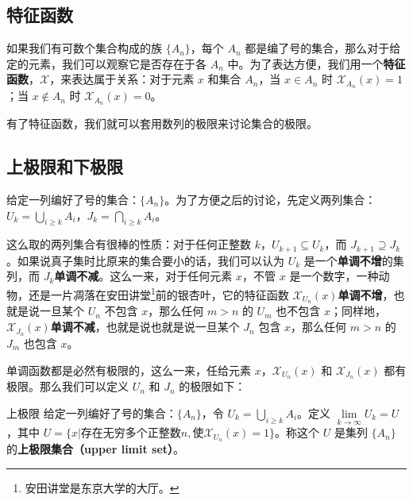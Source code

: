 



\subsection{特征函数}
如果我们有可数个集合构成的族 $\{A_n\}$，每个 $A_n$ 都是编了号的集合，那么对于给定的元素，我们可以观察它是否存在于各 $A_n$ 中。为了表达方便，我们用一个\textbf{特征函数}，$\mathcal{X}$，来表达属于关系：对于元素 $x$ 和集合 $A_n$，当 $x\in A_n$ 时 $\mathcal{X}_{A_n}(x)=1$；当 $x\not\in A_n$ 时 $\mathcal{X}_{A_n}(x)=0$。

有了特征函数，我们就可以套用数列的极限来讨论集合的极限。

\subsection{上极限和下极限}
给定一列编好了号的集合：$\{A_n\}$。为了方便之后的讨论，先定义两列集合：$U_k=\underset{i\ge k}{\bigcup}A_i$，$J_k=\underset{i\ge k}{\bigcap} A_i$。

这么取的两列集合有很棒的性质：对于任何正整数 $k$，$U_{k+1}\subseteq U_k$，而 $J_{k+1}\supseteq J_k$。如果说真子集时比原来的集合要小的话，我们可以认为 $U_k$ 是一个\textbf{单调不增}的集列，而 $J_k$\textbf{单调不减}。这么一来，对于任何元素 $x$，不管 $x$ 是一个数字，一种动物，还是一片凋落在安田讲堂\footnote{安田讲堂是东京大学的大厅。}前的银杏叶，它的特征函数 $\mathcal{X}_{U_n}(x)$\textbf{单调不增}，也就是说一旦某个 $U_n$ 不包含 $x$，那么任何 $m>n$ 的 $U_m$ 也不包含 $x$；同样地，$\mathcal{X}_{J_n}(x)$\textbf{单调不减}，也就是说也就是说一旦某个 $J_n$ 包含 $x$，那么任何 $m>n$ 的 $J_m$ 也包含 $x$。

单调函数都是必然有极限的，这么一来，任给元素 $x$，$\mathcal{X}_{U_n}(x)$ 和 $\mathcal{X}_{J_n}(x)$ 都有极限。那么我们可以定义 $U_n$ 和 $J_n$ 的极限如下：

\begin{definition}{上极限}\label{def_SetLim_1}
给定一列编好了号的集合：$\{A_n\}$，令 $U_k=\underset{i\ge k}{\bigcup} A_i$。定义 $\lim\limits_{k\to\infty} U_k=U$，其中 $U=\{x|\text{存在无穷多个正整数}n,\text{使}\mathcal{X}_{U_n}(x)=1\}$。称这个 $U$ 是集列 $\{A_n\}$ 的\textbf{上极限集合（upper limit set）}。
\end{definition}

